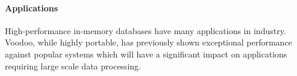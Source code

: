 \paragraph{Applications}

High-performance in-memory databases have many applications in industry. Voodoo, while highly portable, has previously shown exceptional performance against popular systems which will have a significant impact on applications requiring large scale data processing.

